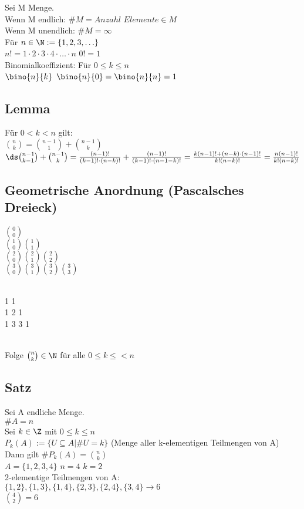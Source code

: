

Sei M Menge.\\
Wenn M endlich: $\#M=Anzahl$ $Elemente\in M$\\
Wenn M unendlich: $\#M=\infty$\\
Für $n\in \N:=\{1,2,3,\ldots\}$\\
$n!=1\cdot 2\cdot 3\cdot 4\cdot \ldots \cdot n$ \hfill $0!=1$\\
Binomialkoeffizient: Für $0\leq k\leq n$\\
$\bino{n}{k}$ \hfill $\bino{n}{0}=\bino{n}{n}=1$\\

\subsection{Lemma}
Für $0<k< n$ gilt:\\
$\binom{n}{k} = \binom{n -1}{1} + \binom{n-1}{k}$\\

\bew 
$\ds \binom{n-1}{k-1}+ \binom{n-1}{k}=\frac{(n-1)!}{(k-1)!\cdot (n-k)!} +\frac{(n-1)!}{(k-1)!\cdot (n-1-k)!} = \frac{k(n-1)!+(n-k)\cdot(n-1)!}{k! (n-k)!}=\frac{n(n-1)!}{k!(n-k)!}$


\subsection{Geometrische Anordnung (Pascalsches Dreieck)}
\parbox{0.5\textwidth}{\centering
$\binom{0}{0}$\\
$\binom{1}{0} \binom{1}{1}$\\
$\binom{2}{0} \binom{2}{1} \binom{2}{2}$\\
$\binom{3}{0} \binom{3}{1} \binom{3}{2} \binom{3}{3}$\\}
\parbox{0.5\textwidth}{\\
1 1\\
1 2 1\\
1 3 3 1\\}\\[5mm]
Folge $\binom{n}{k}\in \N$ für alle $0\leq k\leq<n$


\subsection{Satz}
Sei A endliche Menge.\\
$\#A=n$\\
Sei $k\in\Z$ mit $0\leq k\leq n$\\
$P_k(A):=\{U\subseteq A| \#U=k\}$ (Menge aller k-elementigen Teilmengen von A)\\
Dann gilt $\#P_k(A)=\binom{n}{k}$\\
\bsp
$A=\{1,2,3,4\}$ $n=4$ $k=2$\\
2-elementige Teilmengen von A:\\ $\{1,2\}, \{1,3\}, \{1,4\}, \{2,3\}, \{2,4\}, \{3,4\} \to 6$\\
$\binom{4}{2}=6$ \ok

